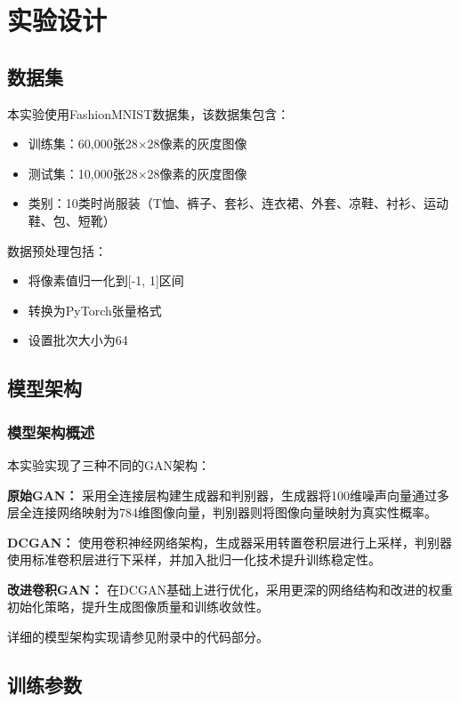 \documentclass[UTF8]{ctexart}
\begin{document}
\section{实验设计}

\subsection{数据集}

本实验使用FashionMNIST数据集，该数据集包含：
\begin{itemize}
\item 训练集：60,000张28×28像素的灰度图像
\item 测试集：10,000张28×28像素的灰度图像
\item 类别：10类时尚服装（T恤、裤子、套衫、连衣裙、外套、凉鞋、衬衫、运动鞋、包、短靴）
\end{itemize}

数据预处理包括：
\begin{itemize}
\item 将像素值归一化到[-1, 1]区间
\item 转换为PyTorch张量格式
\item 设置批次大小为64
\end{itemize}

\subsection{模型架构}

\subsubsection{模型架构概述}

本实验实现了三种不同的GAN架构：

\textbf{原始GAN：}
采用全连接层构建生成器和判别器，生成器将100维噪声向量通过多层全连接网络映射为784维图像向量，判别器则将图像向量映射为真实性概率。

\textbf{DCGAN：}
使用卷积神经网络架构，生成器采用转置卷积层进行上采样，判别器使用标准卷积层进行下采样，并加入批归一化技术提升训练稳定性。

\textbf{改进卷积GAN：}
在DCGAN基础上进行优化，采用更深的网络结构和改进的权重初始化策略，提升生成图像质量和训练收敛性。

详细的模型架构实现请参见附录中的代码部分。

\subsection{训练参数}
\end{document}
